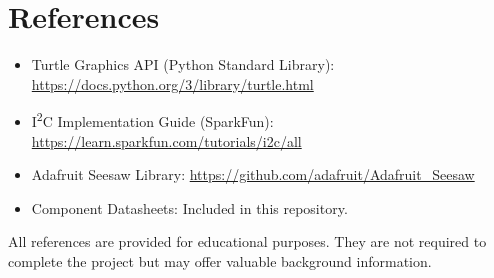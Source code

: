 \documentclass[]{article}
\begin{document}
\section{References}

\begin{itemize}
	\item Turtle Graphics API (Python Standard Library): \url{https://docs.python.org/3/library/turtle.html}
	\item I\textsuperscript{2}C Implementation Guide (SparkFun): \url{https://learn.sparkfun.com/tutorials/i2c/all}
	\item Adafruit Seesaw Library: \url{https://github.com/adafruit/Adafruit_Seesaw}
	\item Component Datasheets: Included in this repository.
\end{itemize}

All references are provided for educational purposes. They are not required to complete the project but may offer valuable background information.
\end{document}
